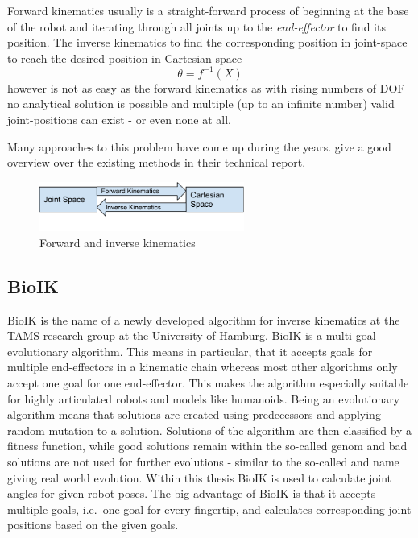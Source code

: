 Forward kinematics usually is a straight-forward process of beginning at the base of the robot and iterating through all joints up to the \textit{end-effector} to find its position. The inverse kinematics to find the corresponding position in joint-space to reach the desired position in Cartesian space
\begin{equation*}
\theta = f^{-1}(X)
\end{equation*}
however is not as easy as the forward kinematics as with rising numbers of DOF no analytical solution is possible and multiple (up to an infinite number) valid joint-positions can exist - or even none at all\cite{DextquotesingleSouza}.

Many approaches to this problem have come up during the years. \citeauthor{andreasaristidou2009inverse} give a good overview over the existing methods in their technical report\cite{DextquotesingleSouza}.

\begin{figure}
	\caption{Forward and inverse kinematics\label{fig:basics:kinematics}}
	\begin{center}
		\includegraphics[width=0.6\textwidth]{assets/chpt_basics/Kinematics.pdf}
	\end{center}
\end{figure}

\subsection{BioIK}
\label{sec:bioik}
BioIK is the name of a newly developed algorithm for inverse kinematics at the TAMS research group at the University of Hamburg\cite{Starke2017}. BioIK is a multi-goal evolutionary algorithm. This means in particular, that it accepts goals for multiple end-effectors in a kinematic chain whereas most other algorithms only accept one goal for one end-effector. This makes the algorithm especially suitable for highly articulated robots and models like humanoids\cite{Starkea2017}. Being an evolutionary algorithm means that solutions are created using predecessors and applying random mutation to a solution. Solutions of the algorithm are then classified by a fitness function, while good solutions remain within the so-called genom and bad solutions are not used for further evolutions\cite{Ruppel17} - similar to the so-called and name giving real world evolution. Within this thesis BioIK is used to calculate joint angles for given robot poses. The big advantage of BioIK is that it accepts multiple goals, i.e.~one goal for every fingertip, and calculates corresponding joint positions based on the given goals.

